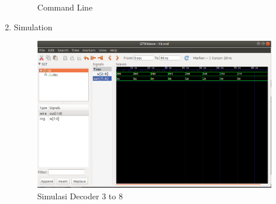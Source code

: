 \documentclass{class}
\begin{document}
\begin{enumerate}
\begin{figure}[H]
        \caption{Command Line}
        \label{decoder24}
        \end{figure}
    \item Simulation
    \begin{figure}[H]
        \centering
        \includegraphics[width=1\linewidth]{gambar/simulation38.png}
        \caption{Simulasi Decoder 3 to 8}
        \label{decoder24}
        \end{figure}
\end{enumerate}
\end{document}
